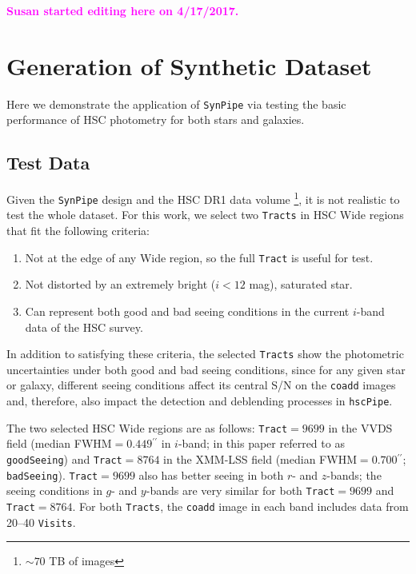 \documentclass[useamsfonts]{pasj01}
\def\asec{$^{\prime\prime}$}
\def\hscpipe{\texttt{hscPipe}}
\def\synpipe{\texttt{SynPipe}}
\def\coadd{\texttt{coadd}}
\def\tract{\texttt{Tract}}
\def\tracts{\texttt{Tracts}}
\def\visits{\texttt{Visits}}
\newcommand{\susan}[1]{\textcolor{magenta} {\textbf{#1}}}
\begin{document}
\susan{Susan started editing here on 4/17/2017.}
\section{Generation of Synthetic Dataset}
    \label{sec:test}

    Here we demonstrate the application of \synpipe{} via testing the basic performance
    of HSC photometry for both stars and galaxies.

\subsection{Test Data}

    Given the \synpipe{} design and the HSC DR1 data volume \footnote{${\sim}70$
    TB of images}, it is not realistic to test the whole dataset. 
    For this work, we select two \tracts{} in HSC Wide regions
    that fit the following criteria:

    \begin{enumerate}

        \item Not at the edge of any Wide region, so the full \tract{} is
            useful for test.

        \item Not distorted by an extremely bright ($i<12$ mag), saturated star.

        \item Can represent both good and bad seeing conditions in the current $i$-band
            data of the HSC survey.
              \end{enumerate}
              In addition to satisfying these criteria, the selected \tracts {}  show the photometric uncertainties under both good and bad seeing conditions, since for any given star or galaxy, different seeing conditions affect its
            central S/N on the \coadd{} images and, therefore, also impact the
            detection and deblending processes in \hscpipe{}.    
            
The two selected HSC Wide regions are as follows:  
    \tract{}$=9699$ in the VVDS field (median FWHM$=0.449$\asec{} in $i$-band;
   in this paper referred to as \texttt{goodSeeing}) and
    \tract{}$=8764$ in the XMM-LSS field (median FWHM$=0.700$\asec{};
    \texttt{badSeeing}).
    \tract{}$=9699$ also has better seeing in both $r$- and $z$-bands;
    the seeing conditions in $g$- and $y$-bands are very similar for both  \tract{}$=9699$ and \tract{}$=8764$.
    For both \tracts{}, the \coadd{} image in each band includes data from
    20--40 \visits{}.
\end{document}
